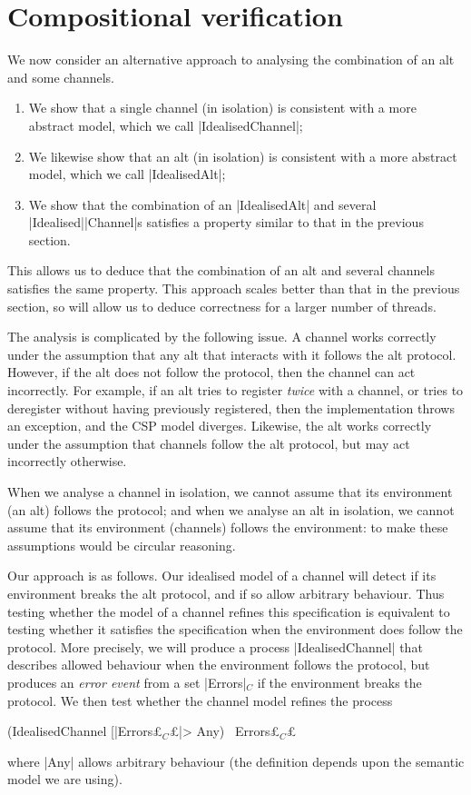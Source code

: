 \section{Compositional verification}
\label{sec:compositional}

\inlineCSP

We now consider an alternative approach to analysing the combination of an alt
and some channels.  
%
\begin{enumerate}
\item We show that a single channel (in isolation) is consistent with a more
  abstract model, which we call |IdealisedChannel|;

\item We likewise show that an alt (in isolation) is consistent with a more
  abstract model, which we call |IdealisedAlt|;

\item We show that the combination of an |IdealisedAlt| and several
  |Idealised|\-|Channel|s satisfies a property similar to that in the previous
  section. 
\end{enumerate}
%
This allows us to deduce that the combination of an alt and several channels
satisfies the same property. This approach scales better than that in the
previous section, so will allow us to deduce correctness for a larger number
of threads.

The analysis is complicated by the following issue.  A channel works correctly
under the assumption that any alt that interacts with it follows the alt
protocol.  However, if the alt does not follow the protocol, then the channel
can act incorrectly.  For example, if an alt tries to register \emph{twice}
with a channel, or tries to deregister without having previously registered,
then the implementation throws an exception, and the CSP model diverges.
Likewise, the alt works correctly under the assumption that channels follow
the alt protocol, but may act incorrectly otherwise.

When we analyse a channel in isolation, we cannot assume that its environment
(an alt) follows the protocol; and when we analyse an alt in isolation, we
cannot assume that its environment (channels) follows the environment: to make
these assumptions would be circular reasoning. 

Our approach is as follows.  Our idealised model of a channel will detect if
its environment breaks the alt protocol, and if so allow arbitrary behaviour.
Thus testing whether the model of a channel refines this specification is
equivalent to testing whether it satisfies the specification when the
environment does follow the protocol.  More precisely, we will produce a
process |IdealisedChannel| that describes allowed behaviour when the environment
follows the protocol, but produces an \emph{error event} from a set
|Errors|$_C$ if the environment breaks the protocol.  We then test whether the
channel model refines the process
%
\begin{cspm}
(IdealisedChannel [|Errors£$_C$£|> Any) \ Errors£$_C$£
\end{cspm}
%
where |Any| allows arbitrary behaviour (the definition depends upon the
semantic model we are using).  

